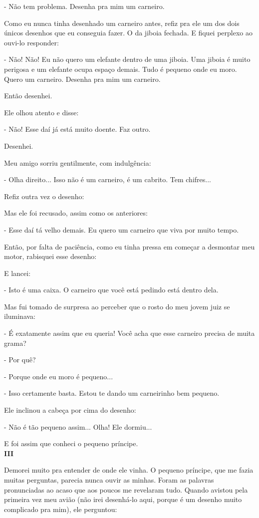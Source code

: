 \begin{Parallel}[p]{}{}
{- Não tem problema. Desenha pra mim um carneiro.

Como eu nunca tinha desenhado um carneiro antes, refiz pra ele um dos
dois únicos desenhos que eu conseguia fazer. O da jiboia fechada. E
fiquei perplexo ao ouvi-lo responder:

- Não! Não! Eu não quero um elefante dentro de uma jiboia. Uma jiboia é
muito perigosa e um elefante ocupa espaço demais. Tudo é pequeno onde eu
moro. Quero um carneiro. Desenha pra mim um carneiro.

Então desenhei.

Ele olhou atento e disse:

- Não! Esse daí já está muito doente. Faz outro.

Desenhei.

Meu amigo sorriu gentilmente, com indulgência:

- Olha direito... Isso não é um carneiro, é um cabrito. Tem chifres...

Refiz outra vez o desenho:

Mas ele foi recusado, assim como os anteriores:

- Esse daí tá velho demais. Eu quero um carneiro que viva por muito
tempo.

Então, por falta de paciência, como eu tinha pressa em começar a
desmontar meu motor, rabisquei esse desenho:

E lancei:

- Isto é uma caixa. O carneiro que você está pedindo está dentro dela.

Mas fui tomado de surpresa ao perceber que o rosto do meu jovem juiz se
iluminava:

- É exatamente assim que eu queria! Você acha que esse carneiro precisa
de muita grama?

- Por quê?

- Porque onde eu moro é pequeno...

- Isso certamente basta. Estou te dando um carneirinho bem pequeno.

Ele inclinou a cabeça por cima do desenho:

- Não é tão pequeno assim... Olha! Ele dormiu...

E foi assim que conheci o pequeno príncipe.\\

\textbf{III}

Demorei muito pra entender de onde ele vinha. O pequeno príncipe, que me
fazia muitas perguntas, parecia nunca ouvir as minhas. Foram as palavras
pronunciadas ao acaso que aos poucos me revelaram tudo. Quando avistou
pela primeira vez meu avião (não irei desenhá-lo aqui, porque é um
desenho muito complicado pra mim), ele perguntou:

}
\end{Parallel}
